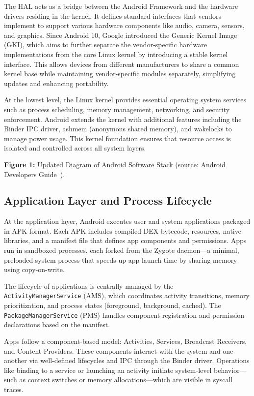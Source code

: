 \documentclass[a4paper,12pt]{report}
\begin{document}
The HAL acts as a bridge between the Android Framework and the hardware drivers residing in the kernel. It defines standard interfaces that vendors implement to support various hardware components like audio, camera, sensors, and graphics. Since Android 10, Google introduced the Generic Kernel Image (GKI), which aims to further separate the vendor-specific hardware implementations from the core Linux kernel by introducing a stable kernel interface. This allows devices from different manufacturers to share a common kernel base while maintaining vendor-specific modules separately, simplifying updates and enhancing portability.

At the lowest level, the Linux kernel provides essential operating system services such as process scheduling, memory management, networking, and security enforcement. Android extends the kernel with additional features including the Binder IPC driver, ashmem (anonymous shared memory), and wakelocks to manage power usage. This kernel foundation ensures that resource access is isolated and controlled across all system layers.

\textbf{Figure 1:} Updated Diagram of Android Software Stack (source: Android Developers Guide~\cite{androidplatformdoc}).


\subsection{Application Layer and Process Lifecycle}
At the application layer, Android executes user and system applications packaged in APK format. Each APK includes compiled DEX bytecode, resources, native libraries, and a manifest file that defines app components and permissions. Apps run in sandboxed processes, each forked from the Zygote daemon—a minimal, preloaded system process that speeds up app launch time by sharing memory using copy-on-write.

The lifecycle of applications is centrally managed by the \texttt{ActivityManagerService} (AMS), which coordinates activity transitions, memory prioritization, and process states (foreground, background, cached). The \texttt{PackageManagerService} (PMS) handles component registration and permission declarations based on the manifest.

Apps follow a component-based model: Activities, Services, Broadcast Receivers, and Content Providers. These components interact with the system and one another via well-defined lifecycles and IPC through the Binder driver. Operations like binding to a service or launching an activity initiate system-level behavior—such as context switches or memory allocations—which are visible in syscall traces.
\end{document}
